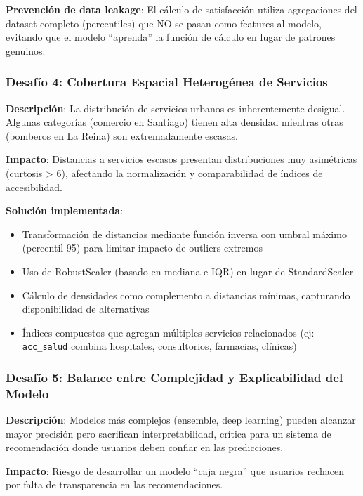 \textbf{Prevención de data leakage}: El cálculo de satisfacción utiliza agregaciones del dataset completo (percentiles) que NO se pasan como features al modelo, evitando que el modelo ``aprenda'' la función de cálculo en lugar de patrones genuinos.

\subsubsection{Desafío 4: Cobertura Espacial Heterogénea de Servicios}

\textbf{Descripción}: La distribución de servicios urbanos es inherentemente desigual. Algunas categorías (comercio en Santiago) tienen alta densidad mientras otras (bomberos en La Reina) son extremadamente escasas.

\textbf{Impacto}: Distancias a servicios escasos presentan distribuciones muy asimétricas (curtosis > 6), afectando la normalización y comparabilidad de índices de accesibilidad.

\textbf{Solución implementada}:
\begin{itemize}
    \item Transformación de distancias mediante función inversa con umbral máximo (percentil 95) para limitar impacto de outliers extremos
    \item Uso de RobustScaler (basado en mediana e IQR) en lugar de StandardScaler
    \item Cálculo de densidades como complemento a distancias mínimas, capturando disponibilidad de alternativas
    \item Índices compuestos que agregan múltiples servicios relacionados (ej: \texttt{acc\_salud} combina hospitales, consultorios, farmacias, clínicas)
\end{itemize}

\subsubsection{Desafío 5: Balance entre Complejidad y Explicabilidad del Modelo}

\textbf{Descripción}: Modelos más complejos (ensemble, deep learning) pueden alcanzar mayor precisión pero sacrifican interpretabilidad, crítica para un sistema de recomendación donde usuarios deben confiar en las predicciones.

\textbf{Impacto}: Riesgo de desarrollar un modelo ``caja negra'' que usuarios rechacen por falta de transparencia en las recomendaciones.

